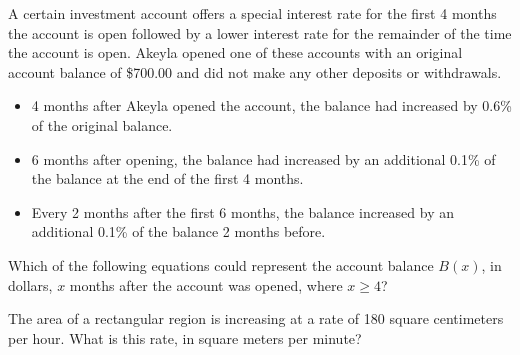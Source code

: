 
\vspace{2em}
\newpage

\noindent\markforreview
\vspace{1em}

A certain investment account offers a special interest rate for the first 4 months the account is open followed by a lower interest rate for the remainder of the time the account is open.
Akeyla opened one of these accounts with an original account balance of \$700.00 and did not make any other deposits or withdrawals.

\begin{itemize}
\item 4 months after Akeyla opened the account, the balance had increased by 0.6\% of the original balance.
\item 6 months after opening, the balance had increased by an additional 0.1\% of the balance at the end of the first 4 months.
\item Every 2 months after the first 6 months, the balance increased by an additional 0.1\% of the balance 2 months before.
\end{itemize}

Which of the following equations could represent the account balance \(B(x)\), in dollars, \(x\) months after the account was opened, where \(x \geq 4\)?

\vspace{0.75em}


\vspace{2em}
\newpage

\noindent\markforreview
\vspace{1em}

The area of a rectangular region is increasing at a rate of 180 square centimeters per hour.
What is this rate, in square meters per minute?

\vspace{0.75em}


\vspace{2em}
\newpage

